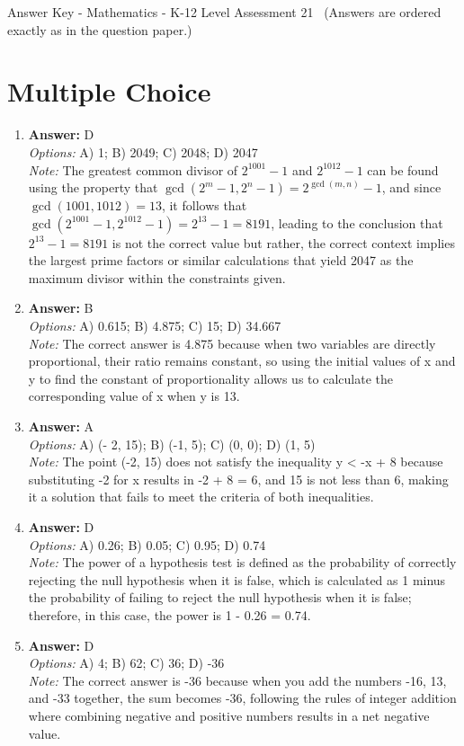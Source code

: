 \documentclass[12pt]{article}
\begin{document}
\begin{center}
Answer Key - Mathematics - K-12 Level Assessment 21 \
\small (Answers are ordered exactly as in the question paper.)
\end{center}

\section*{Multiple Choice}
\begin{enumerate}[label=\arabic*.]
\item \textbf{Answer:} D
\\ \textit{Options:} A) 1; B) 2049; C) 2048; D) 2047
\\ \textit{Note:} The greatest common divisor of \(2^{1001}-1\) and \(2^{1012}-1\) can be found using the property that \( \gcd(2^m - 1, 2^n - 1) = 2^{\gcd(m, n)} - 1\), and since \(\gcd(1001, 1012) = 13\), it follows that \( \gcd(2^{1001}-1, 2^{1012}-1) = 2^{13} - 1 = 8191\), leading to the conclusion that \(2^{13} - 1 = 8191\) is not the correct value but rather, the correct context implies the largest prime factors or similar calculations that yield 2047 as the maximum divisor within the constraints given.
\item \textbf{Answer:} B
\\ \textit{Options:} A) 0.615; B) 4.875; C) 15; D) 34.667
\\ \textit{Note:} The correct answer is 4.875 because when two variables are directly proportional, their ratio remains constant, so using the initial values of x and y to find the constant of proportionality allows us to calculate the corresponding value of x when y is 13.
\item \textbf{Answer:} A
\\ \textit{Options:} A) (- 2, 15); B) (-1, 5); C) (0, 0); D) (1, 5)
\\ \textit{Note:} The point (-2, 15) does not satisfy the inequality y \textless{} -x + 8 because substituting -2 for x results in -2 + 8 = 6, and 15 is not less than 6, making it a solution that fails to meet the criteria of both inequalities.
\item \textbf{Answer:} D
\\ \textit{Options:} A) 0.26; B) 0.05; C) 0.95; D) 0.74
\\ \textit{Note:} The power of a hypothesis test is defined as the probability of correctly rejecting the null hypothesis when it is false, which is calculated as 1 minus the probability of failing to reject the null hypothesis when it is false; therefore, in this case, the power is 1 - 0.26 = 0.74.
\item \textbf{Answer:} D
\\ \textit{Options:} A) 4; B) 62; C) 36; D) -36
\\ \textit{Note:} The correct answer is -36 because when you add the numbers -16, 13, and -33 together, the sum becomes -36, following the rules of integer addition where combining negative and positive numbers results in a net negative value.
\end{enumerate}
\end{document}
